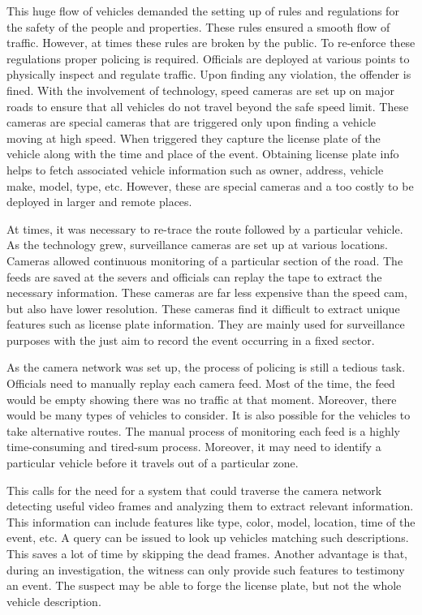 This huge flow of vehicles demanded the setting up of rules and regulations for the safety of the people and properties. These rules ensured a smooth flow of traffic. However, at times these rules are broken by the public. To re-enforce these regulations proper policing is required. Officials are deployed at various points to physically inspect and regulate traffic. Upon finding any violation, the offender is fined. With the involvement of technology, speed cameras are set up on major roads to ensure that all vehicles do not travel beyond the safe speed limit. These cameras are special cameras that are triggered only upon finding a vehicle moving at high speed. When triggered they capture the license plate of the vehicle along with the time and place of the event. Obtaining license plate info helps to fetch associated vehicle information such as owner, address, vehicle make, model, type, etc. However, these are special cameras and a too costly to be deployed in larger and remote places.

At times, it was necessary to re-trace the route followed by a particular vehicle. As the technology grew, surveillance cameras are set up at various locations. Cameras allowed continuous monitoring of a particular section of the road. The feeds are saved at the severs and officials can replay the tape to extract the necessary information. These cameras are far less expensive than the speed cam, but also have lower resolution. These cameras find it difficult to extract unique features such as license plate information. They are mainly used for surveillance purposes with the just aim to record the event occurring in a fixed sector.  

As the camera network was set up, the process of policing is still a tedious task. Officials need to manually replay each camera feed. Most of the time, the feed would be empty showing there was no traffic at that moment. Moreover, there would be many types of vehicles to consider. It is also possible for the vehicles to take alternative routes. The manual process of monitoring each feed is a highly time-consuming and tired-sum process. Moreover, it may need to identify a particular vehicle before it travels out of a particular zone.

This calls for the need for a system that could traverse the camera network detecting useful video frames and analyzing them to extract relevant information. This information can include features like type, color, model, location, time of the event, etc. A query can be issued to look up vehicles matching such descriptions. This saves a lot of time by skipping the dead frames. Another advantage is that, during an investigation, the witness can only provide such features to testimony an event. The suspect may be able to forge the license plate, but not the whole vehicle description. 

